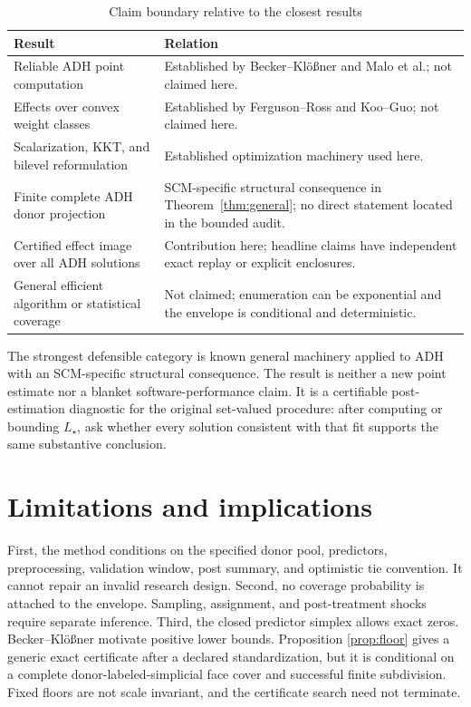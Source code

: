\documentclass[10pt]{article}
\theoremstyle{definition}
\begin{document}
\begin{table}[ht]
\centering
\caption{Claim boundary relative to the closest results}\label{tab:claimmap}
\small
\begin{tabularx}{\textwidth}{@{}p{}X@{}}
\toprule
Result & Relation \\
\midrule
Reliable ADH point computation & Established by Becker--Kl\"o{\ss}ner and Malo et al.; not claimed here. \\
Effects over convex weight classes & Established by Ferguson--Ross and Koo--Guo; not claimed here. \\
Scalarization, KKT, and bilevel reformulation & Established optimization machinery used here. \\
Finite complete ADH donor projection & SCM-specific structural consequence in Theorem~\ref{thm:general}; no direct statement located in the bounded audit. \\
Certified effect image over all ADH solutions & Contribution here; headline claims have independent exact replay or explicit enclosures. \\
General efficient algorithm or statistical coverage & Not claimed; enumeration can be exponential and the envelope is conditional and deterministic. \\
\bottomrule
\end{tabularx}
\end{table}

The strongest defensible category is known general machinery applied to ADH
with an SCM-specific structural consequence.  The result is neither a new
point estimate nor a blanket software-performance claim.  It is a certifiable
post-estimation diagnostic for the original set-valued procedure: after
computing or bounding $L_\star$, ask whether every solution consistent with that
fit supports the same substantive conclusion.

\section{Limitations and implications}

First, the method conditions on the specified donor pool, predictors,
preprocessing, validation window, post summary, and optimistic tie convention.
It cannot repair an invalid research design.  Second, no coverage probability
is attached to the envelope.  Sampling, assignment, and post-treatment shocks
require separate inference.  Third, the closed predictor simplex allows exact
zeros.  Becker--Kl\"o{\ss}ner motivate positive lower bounds.  Proposition
\ref{prop:floor} gives a generic exact certificate after a declared
standardization, but it is conditional on a complete donor-labeled-simplicial
face cover and successful finite subdivision.  Fixed floors are not scale
invariant, and the certificate search need not terminate.
\end{document}
